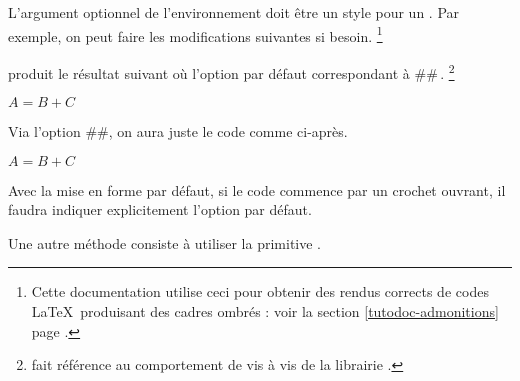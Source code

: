 \documentclass{../main/main}
\begin{document}
\begin{tdocnote}
	L'argument optionnel de l'environnement  doit être un style pour un . Par exemple, on peut faire les modifications suivantes si besoin.%
	\footnote{
		Cette documentation utilise ceci pour obtenir des rendus corrects de codes \LaTeX\ produisant des cadres ombrés : voir la section \ref{tutodoc-admonitions} page \pageref{tutodoc-admonitions}.
	}

\end{tdocnote}


\begin{tdocexa}[À la suite]
     produit le résultat suivant où l'option par défaut correspondant à \tdoclatexin##\,.
    \footnote{
         fait référence au comportement  de  vis à vis de la librairie .
    }

    \begin{tdoclatex}
        $A = B + C$
    \end{tdoclatex}
\end{tdocexa}


\begin{tdocexa}
    Via l'option \tdoclatexin##, on aura juste le code comme ci-après.

    \begin{tdoclatex}
        $A = B + C$
    \end{tdoclatex}
\end{tdocexa}


\begin{tdocwarn}
    Avec la mise en forme par défaut, si le code commence par un crochet ouvrant, il faudra indiquer explicitement l'option par défaut.

    \smallskip

    Une autre méthode consiste à utiliser la primitive .
\end{tdocwarn}
\end{document}
